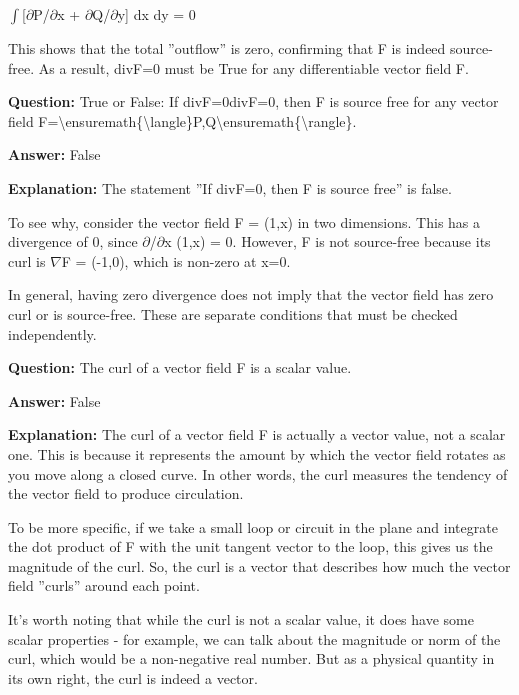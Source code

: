 \documentclass{article}
\begin{document}
\ensuremath{\int}[\ensuremath{\partial}P/\ensuremath{\partial}x + \ensuremath{\partial}Q/\ensuremath{\partial}y] dx dy = 0

This shows that the total ''outflow'' is zero, confirming that F is indeed source-free. As a result, divF=0 must be True for any differentiable vector field F.
                
                \vspace{0.5cm} 
        
            
                \textbf {Question:} True or False: If divF=0divF=0, then F is source free for any vector field F={\textbackslash}ensuremath\{{\textbackslash}langle\}P,Q{\textbackslash}ensuremath\{{\textbackslash}rangle\}.
                
                \textbf{Answer:} False

                \textbf{Explanation:} The statement ''If divF=0, then F is source free'' is false.

To see why, consider the vector field F = (1,x) in two dimensions. This has a divergence of 0, since \ensuremath{\partial}/\ensuremath{\partial}x (1,x) = 0. However, F is not source-free because its curl is \ensuremath{\nabla}{\texttimes}F = (-1,0), which is non-zero at x=0.

In general, having zero divergence does not imply that the vector field has zero curl or is source-free. These are separate conditions that must be checked independently.
                
                \vspace{0.5cm} 
        
            
                \textbf {Question:} The curl of a vector field F is a scalar value.
                
                \textbf{Answer:} False

                \textbf{Explanation:} The curl of a vector field F is actually a vector value, not a scalar one. This is because it represents the amount by which the vector field rotates as you move along a closed curve. In other words, the curl measures the tendency of the vector field to produce circulation.

To be more specific, if we take a small loop or circuit in the plane and integrate the dot product of F with the unit tangent vector to the loop, this gives us the magnitude of the curl. So, the curl is a vector that describes how much the vector field ''curls'' around each point.

It's worth noting that while the curl is not a scalar value, it does have some scalar properties - for example, we can talk about the magnitude or norm of the curl, which would be a non-negative real number. But as a physical quantity in its own right, the curl is indeed a vector.
                
\end{document}
